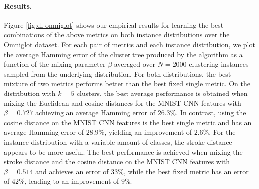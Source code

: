 \paragraph{Results.} Figure \ref{fig:dl-omniglot} shows our empirical results for learning the best combinations of the above metrics on both instance
distributions over the Omniglot dataset. For each pair of metrics and each
instance distribution, we plot the average Hamming error of the cluster tree
produced by the algorithm as a function of the mixing parameter $\beta$ averaged
over $N = 2000$ clustering instances sampled from the underlying distribution.
For both distributions, the best mixture of two metrics performs better than the
best fixed single metric. On the distribution with $k=5$ clusters, the best average
performance is obtained when mixing the Euclidean and cosine distances for the
MNIST CNN features with $\beta = 0.727$ achieving an average Hamming error of
$26.3\%$. In contrast, using the cosine distance on the MNIST CNN features is the
best single metric and has an average Hamming error of $28.9\%$, yielding an
improvement of $2.6\%$. For the instance distribution with a variable amount of classes, the stroke distance
appears to be more useful. The best performance is achieved when mixing the
stroke distance and the cosine distance on the MNIST CNN features with $\beta =
0.514$ and achieves an error of $33\%$, while the best fixed metric has an error of $42\%$,
leading to an improvement of $9\%$.


